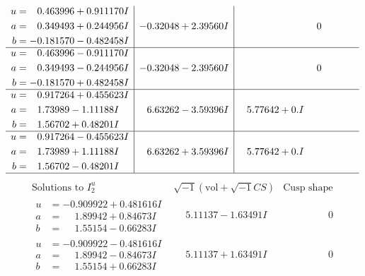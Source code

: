 \documentclass[1p]{elsarticle_modified}
\theoremstyle{definition}
\newcommand{\I}{\sqrt{-1}}
\begin{document}
$$\begin{array}{c|c|c}
\begin{aligned}
u &= \phantom{-}0.463996 + 0.911170 I \\
a &= \phantom{-}0.349493 + 0.244956 I \\
b &= -0.181570 - 0.482458 I\end{aligned}
 & -0.32048 + 2.39560 I & \phantom{-0.000000 } 0 \\ \hline\begin{aligned}
u &= \phantom{-}0.463996 - 0.911170 I \\
a &= \phantom{-}0.349493 - 0.244956 I \\
b &= -0.181570 + 0.482458 I\end{aligned}
 & -0.32048 - 2.39560 I & \phantom{-0.000000 } 0 \\ \hline\begin{aligned}
u &= \phantom{-}0.917264 + 0.455623 I \\
a &= \phantom{-}1.73989 - 1.11188 I \\
b &= \phantom{-}1.56702 + 0.48201 I\end{aligned}
 & \phantom{-}6.63262 - 3.59396 I & \phantom{-}5.77642 + 0. I\phantom{ +0.000000I} \\ \hline\begin{aligned}
u &= \phantom{-}0.917264 - 0.455623 I \\
a &= \phantom{-}1.73989 + 1.11188 I \\
b &= \phantom{-}1.56702 - 0.48201 I\end{aligned}
 & \phantom{-}6.63262 + 3.59396 I & \phantom{-}5.77642 + 0. I\phantom{ +0.000000I}\\
 \hline 
 \end{array}$$\newpage$$\begin{array}{c|c|c}  
\text{Solutions to }I^u_{2}& \I (\text{vol} + \sqrt{-1}CS) & \text{Cusp shape}\\
 \hline 
\begin{aligned}
u &= -0.909922 + 0.481616 I \\
a &= \phantom{-}1.89942 + 0.84673 I \\
b &= \phantom{-}1.55154 - 0.66283 I\end{aligned}
 & \phantom{-}5.11137 - 1.63491 I & \phantom{-0.000000 } 0 \\ \hline\begin{aligned}
u &= -0.909922 - 0.481616 I \\
a &= \phantom{-}1.89942 - 0.84673 I \\
b &= \phantom{-}1.55154 + 0.66283 I\end{aligned}
 & \phantom{-}5.11137 + 1.63491 I & \phantom{-0.000000 } 0 \\ \hline\begin{aligned}

\end{aligned}
\end{array}$$
\end{document}
